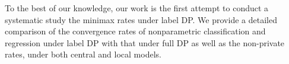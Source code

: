 To the best of our knowledge, our work is the first attempt to conduct a systematic study the minimax rates under label DP. We provide a detailed comparison of the convergence rates of nonparametric classification and regression under label DP with that under full DP as well as the non-private rates, under both central and local models.

